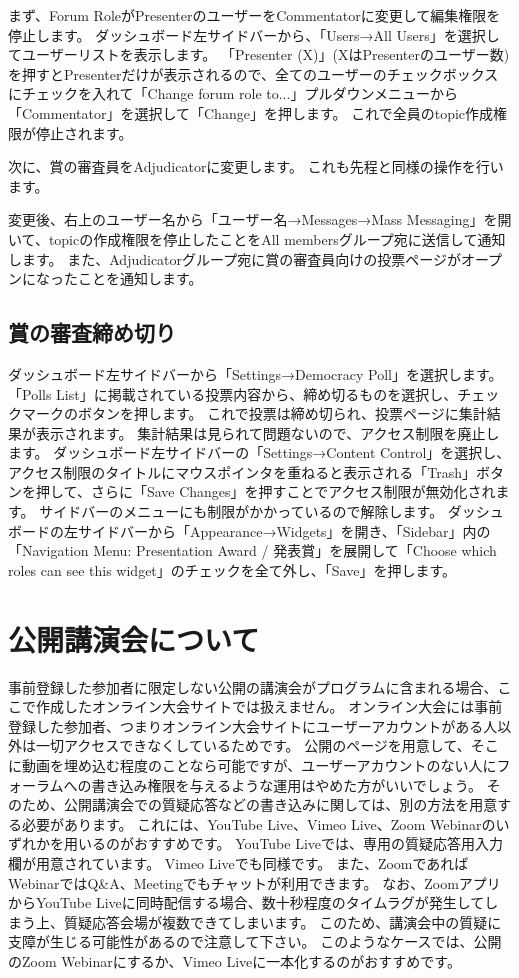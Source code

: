 \documentclass[titlepage,10pt,a4paper,uplatex]{jsbook}
\begin{document}
まず、Forum RoleがPresenterのユーザーをCommentatorに変更して編集権限を停止します。
ダッシュボード左サイドバーから、「Users→All Users」を選択してユーザーリストを表示します。
「Presenter (X)」(XはPresenterのユーザー数)を押すとPresenterだけが表示されるので、全てのユーザーのチェックボックスにチェックを入れて「Change forum role to...」プルダウンメニューから「Commentator」を選択して「Change」を押します。
これで全員のtopic作成権限が停止されます。

次に、賞の審査員をAdjudicatorに変更します。
これも先程と同様の操作を行います。

変更後、右上のユーザー名から「ユーザー名→Messages→Mass Messaging」を開いて、topicの作成権限を停止したことをAll membersグループ宛に送信して通知します。
また、Adjudicatorグループ宛に賞の審査員向けの投票ページがオープンになったことを通知します。

\subsection{賞の審査締め切り}

ダッシュボード左サイドバーから「Settings→Democracy Poll」を選択します。
「Polls List」に掲載されている投票内容から、締め切るものを選択し、チェックマークのボタンを押します。
これで投票は締め切られ、投票ページに集計結果が表示されます。
集計結果は見られて問題ないので、アクセス制限を廃止します。
ダッシュボード左サイドバーの「Settings→Content Control」を選択し、アクセス制限のタイトルにマウスポインタを重ねると表示される「Trash」ボタンを押して、さらに「Save Changes」を押すことでアクセス制限が無効化されます。
サイドバーのメニューにも制限がかかっているので解除します。
ダッシュボードの左サイドバーから「Appearance→Widgets」を開き、「Sidebar」内の「Navigation Menu: Presentation Award / 発表賞」を展開して「Choose which roles can see this widget」のチェックを全て外し、「Save」を押します。

\section{公開講演会について}

事前登録した参加者に限定しない公開の講演会がプログラムに含まれる場合、ここで作成したオンライン大会サイトでは扱えません。
オンライン大会には事前登録した参加者、つまりオンライン大会サイトにユーザーアカウントがある人以外は一切アクセスできなくしているためです。
公開のページを用意して、そこに動画を埋め込む程度のことなら可能ですが、ユーザーアカウントのない人にフォーラムへの書き込み権限を与えるような運用はやめた方がいいでしょう。
そのため、公開講演会での質疑応答などの書き込みに関しては、別の方法を用意する必要があります。
これには、YouTube Live、Vimeo Live、Zoom Webinarのいずれかを用いるのがおすすめです。
YouTube Liveでは、専用の質疑応答用入力欄が用意されています。
Vimeo Liveでも同様です。
また、ZoomであればWebinarではQ\&A、Meetingでもチャットが利用できます。
なお、ZoomアプリからYouTube Liveに同時配信する場合、数十秒程度のタイムラグが発生してしまう上、質疑応答会場が複数できてしまいます。
このため、講演会中の質疑に支障が生じる可能性があるので注意して下さい。
このようなケースでは、公開のZoom Webinarにするか、Vimeo Liveに一本化するのがおすすめです。
\end{document}

